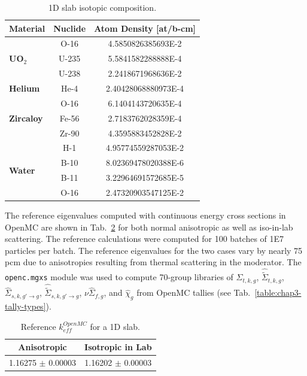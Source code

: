 \begin{table}[h!]
  \centering
  \caption[1D slab isotopic composition]{1D slab isotopic composition.}
  \small
  \label{table:chap5-slab-isotopes} 
  \vspace{6pt}
  \begin{tabular}{b c c}
  \toprule
  \rowcolor{lightgray}
  {\bf Material} &
  {\bf Nuclide} &
  {\bf Atom Density [at/b-cm]} \\
  \midrule
  \multirow{3}{*}{\bf UO$_2$} & O-16 &  4.5850826385693E-2 \\
  & U-235 & 5.5841582288888E-4 \\
  & U-238 & 2.2418671968636E-2 \\
  \midrule
  \multirow{1}{*}{\bf Helium} & He-4 & 2.40428068880973E-4 \\
  \midrule
  \multirow{3}{*}{\bf Zircaloy} & O-16 &  6.1404143720635E-4 \\
  & Fe-56 & 2.7183762028359E-4 \\
  & Zr-90 & 4.3595883452828E-2 \\
  \midrule
  \multirow{4}{*}{\bf Water} & H-1 &  4.95774559287053E-2 \\
  & B-10 & 8.02369478020388E-6 \\
  & B-11 & 3.22964691572685E-5 \\
  & O-16 & 2.47320903547125E-2 \\
  \bottomrule
\end{tabular}
\end{table}

The reference eigenvalues computed with continuous energy cross sections in OpenMC are shown in Tab.~\ref{table:chap5-slab-reference} for both normal anisotropic as well as iso-in-lab scattering. The reference calculations were computed for 100 batches of 1E7 particles per batch. The reference eigenvalues for the two cases vary by nearly 75 \ac{pcm} due to anisotropies resulting from thermal scattering in the moderator. The \texttt{openc.mgxs} module was used to compute 70-group libraries of $\hat{\Sigma}_{t,k,g}$, $\hat{\tilde{\Sigma}}_{t,k,g}$, $\hat{\Sigma}_{s,k,g'\rightarrow g}$, $\hat{\tilde{\Sigma}}_{s,k,g'\rightarrow g}$, $\nu\hat{\Sigma}_{f,g}$, and $\hat{\chi}_{g}$ from OpenMC tallies (see Tab.~\ref{table:chap3-tally-types}).

\begin{table}[h!]
  \centering
  \caption[Reference $k^{OpenMC}_{eff}$ for a 1D slab]{Reference $k^{OpenMC}_{eff}$ for a 1D slab.}
  \small
  \label{table:chap5-slab-reference} 
  \vspace{6pt}
  \begin{tabular}{c c}
  \toprule
  \rowcolor{lightgray}
  {\bf Anisotropic} &
  {\bf Isotropic in Lab} \\
  \midrule
  1.16275 $\pm$ 0.00003 & 1.16202 $\pm$ 0.00003 \\
  \bottomrule
\end{tabular}
\end{table}


